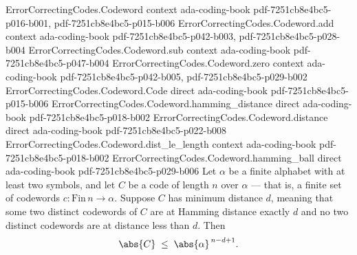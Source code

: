 \begin{theorem}
\label{ErrorCorrectingCodes.Codeword.singleton_bound}
\leanok
{}
\proofstep
  {ErrorCorrectingCodes.Codeword}
  {context}
  {ada-coding-book}
  {pdf-7251cb8e4bc5-p016-b001,
    pdf-7251cb8e4bc5-p015-b006}
\proofstep
  {ErrorCorrectingCodes.Codeword.add}
  {context}
  {ada-coding-book}
  {pdf-7251cb8e4bc5-p042-b003,
    pdf-7251cb8e4bc5-p028-b004}
\proofstep
  {ErrorCorrectingCodes.Codeword.sub}
  {context}
  {ada-coding-book}
  {pdf-7251cb8e4bc5-p047-b004}
\proofstep
  {ErrorCorrectingCodes.Codeword.zero}
  {context}
  {ada-coding-book}
  {pdf-7251cb8e4bc5-p042-b005,
    pdf-7251cb8e4bc5-p029-b002}
\proofstep
  {ErrorCorrectingCodes.Codeword.Code}
  {direct}
  {ada-coding-book}
  {pdf-7251cb8e4bc5-p015-b006}
\proofstep
  {ErrorCorrectingCodes.Codeword.hamming_distance}
  {direct}
  {ada-coding-book}
  {pdf-7251cb8e4bc5-p018-b002}
\proofstep
  {ErrorCorrectingCodes.Codeword.distance}
  {direct}
  {ada-coding-book}
  {pdf-7251cb8e4bc5-p022-b008}
\proofstep
  {ErrorCorrectingCodes.Codeword.dist_le_length}
  {context}
  {ada-coding-book}
  {pdf-7251cb8e4bc5-p018-b002}
\proofstep
  {ErrorCorrectingCodes.Codeword.hamming_ball}
  {direct}
  {ada-coding-book}
  {pdf-7251cb8e4bc5-p029-b006}
Let $\alpha$ be a finite alphabet with at least two symbols, and let $C$ be a code of
length $n$ over $\alpha$ — that is, a finite set of codewords $c : \mathrm{Fin}\,n \to
\alpha$. Suppose $C$ has minimum distance $d$, meaning that some two distinct codewords
of $C$ are at Hamming distance exactly $d$ and no two distinct codewords are at distance
less than $d$. Then
\[
\abs{C} \;\le\; \abs{\alpha}^{\,n-d+1}.
\]
\end{theorem}
